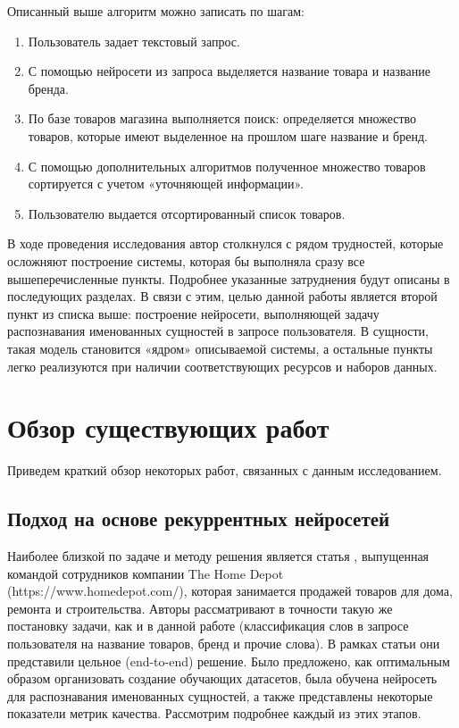 \documentclass[12pt,a4paper]{article}
\begin{document}
Описанный выше алгоритм можно записать по шагам:

\begin{enumerate}
    \item Пользователь задает текстовый запрос.
    \item С помощью нейросети из запроса выделяется название товара и название бренда.
    \item По базе товаров магазина выполняется поиск: определяется множество товаров, которые имеют выделенное на прошлом шаге название и бренд.
    \item С помощью дополнительных алгоритмов полученное множество товаров сортируется с учетом «уточняющей информации».
    \item Пользователю выдается отсортированный список товаров.
\end{enumerate}

\noindent В ходе проведения исследования автор столкнулся с рядом трудностей, которые осложняют построение системы, которая бы выполняла сразу все вышеперечисленные пункты. Подробнее указанные затруднения будут описаны в последующих разделах. В связи с этим, целью данной работы является второй пункт из списка выше: построение нейросети, выполняющей задачу распознавания именованных сущностей в запросе пользователя. В сущности, такая модель становится «ядром» описываемой системы, а остальные пункты легко реализуются при наличии соответствующих ресурсов и наборов данных.

\section{Обзор существующих работ}
Приведем краткий обзор некоторых работ, связанных с данным исследованием.
\subsection{Подход на основе рекуррентных нейросетей}
Наиболее близкой по задаче и методу решения является статья \cite{ner}, выпущенная командой сотрудников компании The Home Depot (https://www.homedepot.com/), которая занимается продажей товаров для дома, ремонта и строительства. Авторы рассматривают в точности такую же постановку задачи, как и в данной работе (классификация слов в запросе пользователя на название товаров, бренд и прочие слова). В рамках статьи они представили цельное (end-to-end) решение. Было предложено, как оптимальным образом организовать создание обучающих датасетов, была обучена нейросеть для распознавания именованных сущностей, а также представлены некоторые показатели метрик качества. Рассмотрим подробнее каждый из этих этапов. 
\end{document}

